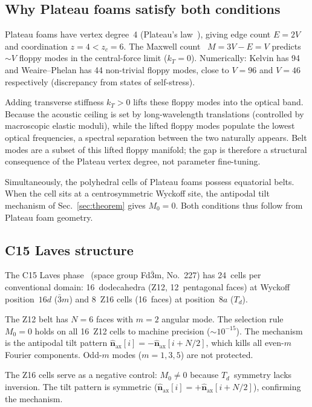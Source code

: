 \documentclass[12pt]{article}
\newcommand{\vn}{\hat{\bm{n}}}
\begin{document}
\subsection{Why Plateau foams satisfy both conditions}
\label{sec:why_foams}

Plateau foams have vertex degree~4 (Plateau's
law~\cite{Plateau1873}), giving edge count $E = 2V$ and coordination
$z = 4 < z_c = 6$.  The Maxwell count~\cite{Maxwell1864,Calladine1978}
$M = 3V - E = V$ predicts $\sim\!V$ floppy modes in the central-force
limit ($k_T = 0$).  Numerically: Kelvin has 94 and Weaire--Phelan has
44 non-trivial floppy modes, close to $V = 96$ and $V = 46$
respectively (discrepancy from states of self-stress).

Adding transverse stiffness $k_T > 0$ lifts these floppy modes into
the optical band.  Because the acoustic ceiling is set by
long-wavelength translations (controlled by macroscopic elastic
moduli), while the lifted floppy modes populate the lowest optical
frequencies, a spectral separation between the two naturally appears.
Belt modes are a subset of this lifted floppy manifold; the gap is
therefore a structural consequence of the Plateau vertex degree, not
parameter fine-tuning.

Simultaneously, the polyhedral cells of Plateau foams possess
equatorial belts.  When the cell sits at a centrosymmetric Wyckoff
site, the antipodal tilt mechanism of Sec.~\ref{sec:theorem} gives
$M_0 = 0$.  Both conditions thus follow from Plateau foam geometry.

\subsection{C15 Laves structure}
\label{sec:c15}

The C15 Laves phase~\cite{FrankKasper1958} (space group Fd$\bar{3}$m,
No.~227) has 24~cells
per conventional domain: 16~dodecahedra (Z12, 12~pentagonal faces) at
Wyckoff position~$16d$ ($\bar{3}m$) and 8~Z16 cells
(16~faces) at position~$8a$ ($T_d$).

The Z12 belt has $N = 6$ faces with $m = 2$ angular mode.  The
selection rule $M_0 = 0$ holds on all 16~Z12 cells to machine
precision ($\sim\!10^{-15}$).  The mechanism is the antipodal tilt
pattern $\vn_{\mathrm{ax}}[i] = -\vn_{\mathrm{ax}}[i + N/2]$, which
kills all even-$m$ Fourier components.  Odd-$m$ modes ($m = 1, 3, 5$)
are not protected.

The Z16 cells serve as a negative control: $M_0 \neq 0$ because
$T_d$~symmetry lacks inversion.  The tilt pattern is symmetric
($\vn_{\mathrm{ax}}[i] = +\vn_{\mathrm{ax}}[i + N/2]$), confirming
the mechanism.
\end{document}
